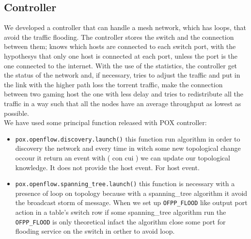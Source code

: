 \documentclass[conference,10pt]{IEEEtran}
\begin{document}
\subsection{Controller}
We developed a controller that can handle a mesh network, which has loops, that avoid
the traffic flooding. The controller stores the switch and the connection between them;
knows which hosts are connected to each switch port, with the hypothesys that only one
host is connected at each port, unless the port is the one connected to the internet.
With the use of the statistics, the controller get the status of the network and, if necessary,
tries to adjust the traffic and put in the link with the higher path loss the torrent traffic,
make the connection between two gaming host the one with less delay and tries to redistribute all the traffic in a way
such that all the nodes have an average throughput as lowest as possible.
\\
\newline
We have used some principal function released with POX controller:
\begin{itemize}
 \item \texttt{pox.openflow.discovery.launch()} this function run algorithm in order to discovery the network and every time in witch some new
 topological change occour it return an event with ( con cui ) we can update our topological knowledge.
 It does not provide the host event. For host event\cite{pox}.
 \item \texttt{pox.openflow.spanning_tree.launch()} this function is necessary with a presence of loop on topology
 because with a spanning_tree algorithm it avoid the broadcast storm of message. When we set up \texttt{OFPP_FLOOD} like output port action in a table's
 switch row if some spanning_tree algorithm run the \texttt{OFPP_FLOOD} is only theoretical infact the algorithm close some port for flooding service
 on the switch in orther to avoid loop\cite{pox}.
\end{itemize}
\end{document}

